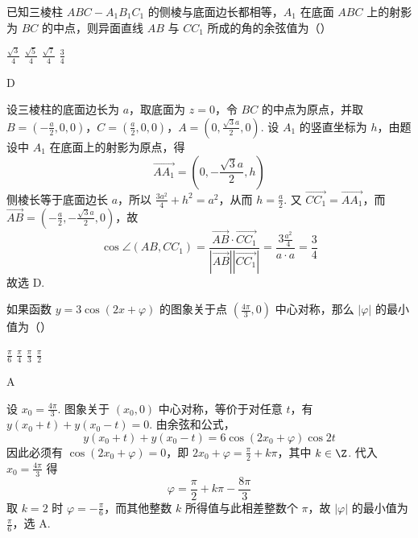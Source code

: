 \begin{problem}
已知三棱柱 \(ABC - A_{1}B_{1}C_{1}\) 的侧棱与底面边长都相等，\(A_{1}\) 在底面 \(ABC\) 上的射影为 \(BC\) 的中点，则异面直线 \(AB\) 与 \(CC_{1}\) 所成的角的余弦值为（\quad）

\choices
    {\(\frac{\sqrt{3}}{4}\)}
    {\(\frac{\sqrt{5}}{4}\)}
    {\(\frac{\sqrt{7}}{4}\)}
    {\(\frac{3}{4}\)}
\end{problem}

\begin{answer}
D
\end{answer}

\begin{solution}
设三棱柱的底面边长为 \(a\)，取底面为 \(z=0\)，令 \(BC\) 的中点为原点，并取
\(B=\left(-\frac{a}{2},0,0\right)\)，\(C=\left(\frac{a}{2},0,0\right)\)，\(A=\left(0,\frac{\sqrt{3}a}{2},0\right)\). 设 \(A_{1}\) 的竖直坐标为 \(h\)，由题设中 \(A_{1}\) 在底面上的射影为原点，得
\[
\overrightarrow{AA_{1}}=\left(0,-\frac{\sqrt{3}a}{2},h\right)
\]
侧棱长等于底面边长 \(a\)，所以 \(\frac{3a^2}{4}+h^2=a^2\)，从而 \(h=\frac{a}{2}\). 又 \(\overrightarrow{CC_{1}}=\overrightarrow{AA_{1}}\)，而 \(\overrightarrow{AB}=\left(-\frac{a}{2},-\frac{\sqrt{3}a}{2},0\right)\)，故
\[
\cos\angle\left(AB,CC_{1}\right)=\frac{\overrightarrow{AB}\cdot\overrightarrow{CC_{1}}}{|\overrightarrow{AB}||\overrightarrow{CC_{1}}|}
=\frac{3\frac{a^2}{4}}{a\cdot a}=\frac{3}{4}
\]
故选 D.
\end{solution}

\begin{problem}
如果函数 \( y = 3\cos (2x + \varphi) \) 的图象关于点 \( \left(\frac{4\pi}{3},0\right) \) 中心对称，那么 \( |\varphi| \) 的最小值为（\quad）

\choices
    {\(\frac{\pi}{6}\)}
    {\(\frac{\pi}{4}\)}
    {\(\frac{\pi}{3}\)}
    {\(\frac{\pi}{2}\)}
\end{problem}

\begin{answer}
A
\end{answer}

\begin{solution}
设 \(x_0=\frac{4\pi}{3}\). 图象关于 \((x_0,0)\) 中心对称，等价于对任意 \(t\)，有 \(y(x_0+t)+y(x_0-t)=0\). 由余弦和公式，
\[
y(x_0+t)+y(x_0-t)=6\cos(2x_0+\varphi)\cos 2t
\]
因此必须有 \(\cos(2x_0+\varphi)=0\)，即 \(2x_0+\varphi=\frac{\pi}{2}+k\pi\)，其中 \(k\in\Z\). 代入 \(x_0=\frac{4\pi}{3}\) 得
\[
\varphi=\frac{\pi}{2}+k\pi-\frac{8\pi}{3}
\]
取 \(k=2\) 时 \(\varphi=-\frac{\pi}{6}\)，而其他整数 \(k\) 所得值与此相差整数个 \(\pi\)，故 \(|\varphi|\) 的最小值为 \(\frac{\pi}{6}\)，选 A.
\end{solution}


